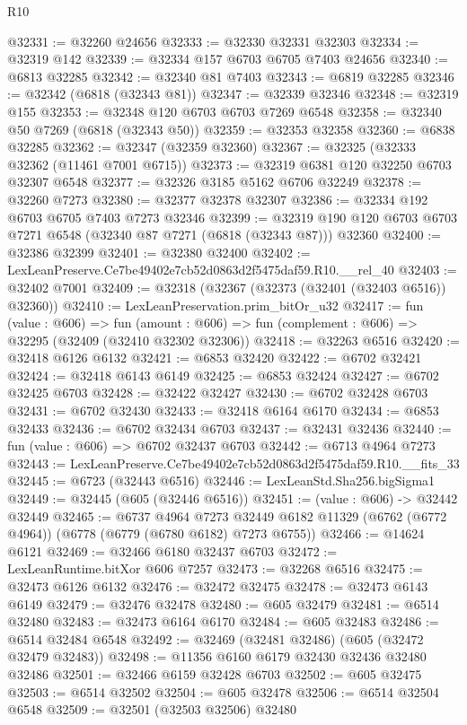 \begin{lexlean}{R10}
\begin{coremodule}
@32331 := @32260 @24656
@32333 := @32330 @32331 @32303
@32334 := @32319 @142
@32339 := @32334 @157 @6703 @6705 @7403 @24656
@32340 := @6813 @32285
@32342 := @32340 @81 @7403
@32343 := @6819 @32285
@32346 := @32342 (@6818 (@32343 @81))
@32347 := @32339 @32346
@32348 := @32319 @155
@32353 := @32348 @120 @6703 @6703 @7269 @6548
@32358 := @32340 @50 @7269 (@6818 (@32343 @50))
@32359 := @32353 @32358
@32360 := @6838 @32285
@32362 := @32347 (@32359 @32360)
@32367 := @32325 (@32333 @32362 (@11461 @7001 @6715))
@32373 := @32319 @6381 @120 @32250 @6703 @32307 @6548
@32377 := @32326 @3185 @5162 @6706 @32249
@32378 := @32260 @7273
@32380 := @32377 @32378 @32307
@32386 := @32334 @192 @6703 @6705 @7403 @7273 @32346
@32399 := @32319 @190 @120 @6703 @6703 @7271 @6548 (@32340 @87 @7271 (@6818 (@32343 @87))) @32360
@32400 := @32386 @32399
@32401 := @32380 @32400
@32402 := LexLeanPreserve.Ce7be49402e7cb52d0863d2f5475daf59.R10.__rel_40
@32403 := @32402 @7001
@32409 := @32318 (@32367 (@32373 (@32401 (@32403 @6516)) @32360))
@32410 := LexLeanPreservation.prim_bitOr_u32
@32417 := fun (value : @606) =>
  fun (amount : @606) => fun (complement : @606) => @32295 (@32409 (@32410 @32302 @32306))
@32418 := @32263 @6516
@32420 := @32418 @6126 @6132
@32421 := @6853 @32420
@32422 := @6702 @32421
@32424 := @32418 @6143 @6149
@32425 := @6853 @32424
@32427 := @6702 @32425 @6703
@32428 := @32422 @32427
@32430 := @6702 @32428 @6703
@32431 := @6702 @32430
@32433 := @32418 @6164 @6170
@32434 := @6853 @32433
@32436 := @6702 @32434 @6703
@32437 := @32431 @32436
@32440 := fun (value : @606) => @6702 @32437 @6703
@32442 := @6713 @4964 @7273
@32443 := LexLeanPreserve.Ce7be49402e7cb52d0863d2f5475daf59.R10.__fits_33
@32445 := @6723 (@32443 @6516)
@32446 := LexLeanStd.Sha256.bigSigma1
@32449 := @32445 (@605 (@32446 @6516))
@32451 := (value : @606) -> @32442 @32449
@32465 := @6737
    @4964
    @7273
    @32449
    @6182
    @11329
    (@6762 (@6772 @4964))
    (@6778 (@6779 (@6780 @6182) @7273 @6755))
@32466 := @14624 @6121
@32469 := @32466 @6180 @32437 @6703
@32472 := LexLeanRuntime.bitXor @606 @7257
@32473 := @32268 @6516
@32475 := @32473 @6126 @6132
@32476 := @32472 @32475
@32478 := @32473 @6143 @6149
@32479 := @32476 @32478
@32480 := @605 @32479
@32481 := @6514 @32480
@32483 := @32473 @6164 @6170
@32484 := @605 @32483
@32486 := @6514 @32484 @6548
@32492 := @32469 (@32481 @32486) (@605 (@32472 @32479 @32483))
@32498 := @11356 @6160 @6179 @32430 @32436 @32480 @32486
@32501 := @32466 @6159 @32428 @6703
@32502 := @605 @32475
@32503 := @6514 @32502
@32504 := @605 @32478
@32506 := @6514 @32504 @6548
@32509 := @32501 (@32503 @32506) @32480

\end{coremodule}
\end{lexlean}
